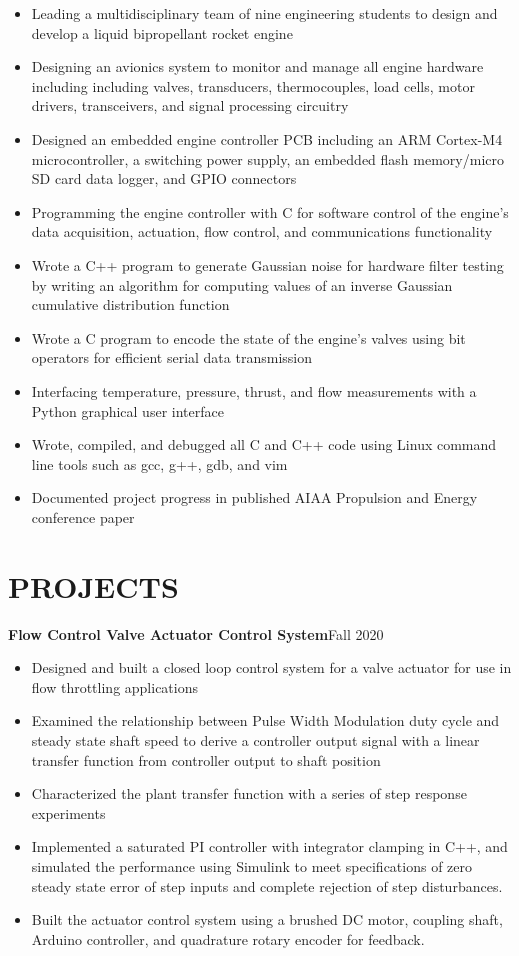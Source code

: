 \documentclass{article}
\begin{document}
\begin{itemize}
\item{Leading a multidisciplinary team of nine engineering students to design and develop a liquid bipropellant rocket engine}
	\item{Designing an avionics system to monitor and manage all engine hardware including including valves, transducers, thermocouples, load cells, motor drivers, transceivers, and signal processing circuitry}
\item{Designed an embedded engine controller PCB including an ARM Cortex-M4 microcontroller, a switching power supply, an embedded flash memory/micro SD card data logger, and GPIO connectors}
	\item{Programming the engine controller with C for software control of the engine's data acquisition, actuation, flow control, and communications functionality}
	\item{Wrote a C++ program to generate Gaussian noise for hardware filter testing by writing an algorithm for computing values of an inverse Gaussian cumulative distribution function}
	\item{Wrote a C program to encode the state of the engine's valves using bit operators for efficient serial data transmission}
	\item{Interfacing temperature, pressure, thrust, and flow measurements with a Python graphical user interface}
	\item{Wrote, compiled, and debugged all C and C++ code using Linux command line tools such as gcc, g++, gdb, and vim}
	\item{Documented project progress in published AIAA Propulsion and Energy conference paper}
\end{itemize}
\section{PROJECTS}
\vspace{0.5em}
\textbf{Flow Control Valve Actuator Control System}\hfill Fall 2020
\vspace{0.5em}
\begin{itemize}
	\item Designed and built a closed loop control system for a valve actuator for use in flow throttling applications
	\item Examined the relationship between Pulse Width Modulation duty cycle and steady state shaft speed to derive a controller output signal with a linear transfer function from controller output to shaft position  
	\item Characterized the plant transfer function with a series of step response experiments
	\item  Implemented a saturated PI controller with integrator clamping in C++, and simulated the performance using Simulink to meet specifications of zero steady state error of step inputs and complete rejection of step disturbances.
	\item  Built the actuator control system using a brushed DC motor, coupling shaft, Arduino controller, and quadrature rotary encoder for feedback.
\end{itemize}
\vspace{0.5em}
\thispagestyle{empty}
\end{document}
